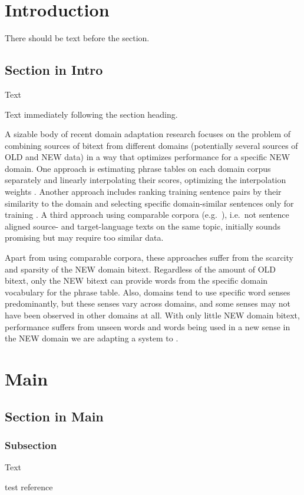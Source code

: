 \documentclass[svgnames]{report}
\newlength\tablength        \setlength\tablength{20pt}
\newlength\ruledepth        \setlength\ruledepth{2pt}
\newlength\rulelength       \setlength\rulelength{0.95\textwidth}
\newlength\tabheight        \setlength\tabheight{0.25in} \addtolength\tabheight{-\ruledepth}
\newlength\raisetitle       \setlength\raisetitle{1ex}
\newlength\insettitle       \setlength\insettitle{1.5em}
\newlength\afterheadingskip \setlength\afterheadingskip{9ex}
\newcommand\problems{%
  \par\noindent
  \begin{tikzpicture} [remember picture,overlay]
      \node[yshift=0.2em-1em-11pt-11pt,xshift=-2cm] at (0,0) %
      {
      \bfseries\Large\sffamily
      \begin{tikzpicture}[remember picture, overlay]
        \fill[fill=LightSkyBlue] (0,0) rectangle
          (\paperwidth,0.2cm);
        \node[anchor=west,yshift=2ex+0.2cm-1.5pt,xshift=2.5pt,rectangle,
              rounded corners=0pt,inner sep=11pt,
              fill=MidnightBlue]
              {\hspace*{-11pt}\hspace*{-3pt}\hspace*{2cm}\color{white} Something in a rect};
       \end{tikzpicture}
      };

  \end{tikzpicture}%
  \\[\afterheadingskip]
}
\begin{document}
\tableofcontents
\chapter{Introduction}
There should be text before the section.

\section{Section in Intro}
Text


Text immediately following the section heading.

A sizable body of recent domain adaptation research focuses on the problem of combining sources of bitext from different domains (potentially several sources of OLD and NEW data) in a way that optimizes performance for a specific NEW domain.
One approach is estimating phrase tables on each domain corpus separately and linearly interpolating their scores, optimizing the interpolation weights \cite{foster2007mixture}. Another approach includes ranking training sentence pairs by their similarity to the domain and selecting specific domain-similar sentences only for training \cite{axelrod2011domain}. A third approach using comparable corpora (e.g.\ \cite{daume2011domain}), i.e.\ not sentence aligned source- and target-language texts on the same topic, initially sounds promising but may require too similar data.

Apart from using comparable corpora, these approaches suffer from the scarcity and sparsity of the NEW domain bitext. Regardless of the amount of OLD bitext, only the NEW bitext can provide words from the specific domain vocabulary for the phrase table. Also, domains tend to use specific word senses predominantly, but these senses vary across domains, and some senses may not have been observed in other domains at all. %
With only little NEW domain bitext, performance suffers from unseen words and words being used in a new sense in the NEW domain we are adapting a system to \cite{irvine2013measuring}. %



\chapter{Main}
\section{Section in Main}
\subsection{Subsection}
Text
\begin{thebibliography}{99}
 test reference
\end{thebibliography}
\end{document}
